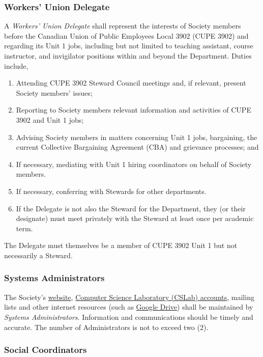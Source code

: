 \subsubsection{Workers’ Union Delegate}
A \textit{Workers' Union Delegate} shall represent the interests of Society
members before the Canadian Union of Public Employees Local 3902 (CUPE 3902)
and regarding its Unit 1 jobs, including but not limited to teaching assistant,
course instructor, and invigilator positions within and beyond the Department.
Duties include,
\begin{enumerate}
      \item Attending CUPE 3902 Steward Council meetings and, if relevant, present Society
            members' issues;
      \item Reporting to Society members relevant information and activities of CUPE 3902
            and Unit 1 jobs;
      \item Advising Society members in matters concerning Unit 1 jobs, bargaining, the
            current Collective Bargaining Agreement (CBA) and grievance processes; and
      \item If necessary, mediating with Unit 1 hiring coordinators on behalf of Society
            members.
      \item If necessary, conferring with Stewards for other departments.
      \item If the Delegate is not also the Steward for the Department, they (or their
            designate) must meet privately with the Steward at least once per academic
            term.
\end{enumerate}
The Delegate must themselves be a member of CUPE 3902 Unit 1 but not necessarily a Steward.

\subsubsection{Systems Administrators}\label{sec:administrators}

The Society's \href{https://www.cs.toronto.edu/csgsbs/}{website},
\href{https://support.cs.toronto.edu/}{Computer Science Laboratory (CSLab)
      accounts}, mailing lists and other internet resources (such as
\href{https://drive.google.com/}{Google Drive}) shall be maintained by
\textit{Systems Administrators}. Information and communications should be
timely and accurate. The number of Administrators is not to exceed two ($2$).

\subsubsection{Social Coordinators}\label{sec:coordinators}

